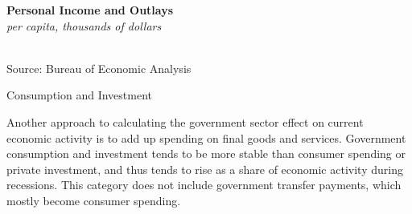 \documentclass{report}
\makeatletter
\newcommand{\tbllink}[1]{\href{https://raw.githubusercontent.com/bdecon/US-chartbook/master/chartbook/data/#1}{\faTable}}
\newcommand*\short[1]{\expandafter\@gobbletwo\number\numexpr#1\relax}
\newcommand{\stdnode}[3]{\node[below, align=left, shift=({#1,#2})]{#3};}
\newcommand{\shdateaxisticks}{
		date coordinates in=x, axis line style={draw=none},
		xmax={2023-11-01},
		max space between ticks=40,	    
		xtick={{1990-01-01}, {1995-01-01}, {2000-01-01}, 
			{2005-01-01}, {2010-01-01}, {2015-01-01}, {2020-01-01}},
		minor xtick={},
		enlarge y limits={0.06}, enlarge x limits={0.01},
		}
\newcommand{\bbar}[2]{extra #1 ticks = {{#2}}, extra #1 tick labels = ,
		extra #1 tick style = {grid=major, grid style={thick, black!25}},}
\newcommand{\stdline}[4]{\addplot[very thick, no markers, color=#1] 
		table [x=#2, y=#3, col sep=comma] {#4};	}
\newcommand{\rbars}{
		\fill[color=black!10] (axis cs:{1990-07-01},\pgfkeysvalueof{/pgfplots/ymin}) rectangle 
			(axis cs:{1991-03-01}, \pgfkeysvalueof{/pgfplots/ymax});
		\fill[color=black!10] (axis cs:{2007-12-01},\pgfkeysvalueof{/pgfplots/ymin}) rectangle 
			(axis cs:{2009-07-01}, \pgfkeysvalueof{/pgfplots/ymax});
		\fill[color=black!10] (axis cs:{2001-03-01},\pgfkeysvalueof{/pgfplots/ymin}) rectangle 
			(axis cs:{2001-11-01}, \pgfkeysvalueof{/pgfplots/ymax});
		\fill[color=black!10] (axis cs:{2020-02-01},\pgfkeysvalueof{/pgfplots/ymin}) rectangle 
			(axis cs:{2020-05-01}, \pgfkeysvalueof{/pgfplots/ymax});}
\makeatother
\begin{document}
{\begin{minipage}{0.38\textwidth}
\normalsize \textbf{Personal Income and Outlays}\\
\footnotesize{\textit{per capita, thousands of dollars}}\\
\hspace*{-2mm} \\
\footnotesize{Source: Bureau of Economic Analysis} \hfill \tbllink{govpi.csv}
\end{minipage}\hspace{5.5mm}
\begin{minipage}{0.34\textwidth}
\small 
\end{minipage}
\vspace{3mm}

\begin{minipage}{0.76\textwidth}
\normalsize Consumption and Investment
\vspace{-1mm}

\small Another approach to calculating the government sector effect on current economic activity is to add up spending on final goods and services. Government consumption and investment tends to be more stable than consumer spending or private investment, and thus tends to rise as a share of economic activity during recessions. This category does not include government transfer payments, which mostly become consumer spending.
\end{minipage}
\vspace{1mm}

}
\end{document}
